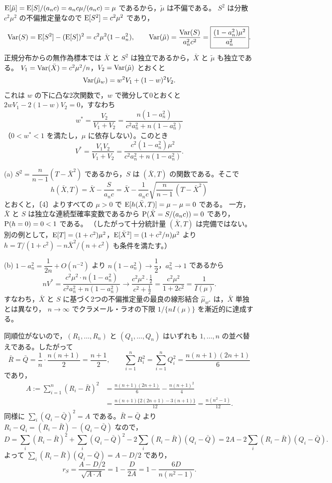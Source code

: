 \documentclass[a4paper,11pt]{ltjsarticle}
\begin{document}
$\operatorname{E}[\tilde\mu]=\operatorname{E}[S]/(a_nc)=a_nc\mu/(a_nc)=\mu$ であるから，$\tilde\mu$ は不偏である。
$S^2$ は分散 $c^2\mu^2$ の不偏推定量なので $\operatorname{E}[S^2]=c^2\mu^2$ であり，
\[
\operatorname{Var}(S)=\operatorname{E}[S^2]-(\operatorname{E}[S])^2=c^2\mu^2(1-a_n^2),
\qquad
\operatorname{Var}(\tilde\mu)=\frac{\operatorname{Var}(S)}{a_n^2c^2}=\boxed{\frac{(1-a_n^2)\mu^2}{a_n^2}}.
\]
正規分布からの無作為標本では $\bar X$ と $S^2$ は独立であるから，$\bar X$ と $\tilde\mu$ も独立である。
$V_1=\operatorname{Var}(\bar X)=c^2\mu^2/n$，$V_2=\operatorname{Var}(\tilde\mu)$ とおくと
\[
\operatorname{Var}(\hat\mu_w)=w^2V_1+(1-w)^2V_2 .
\]
これは $w$ の下に凸な2次関数で，$w$ で微分して0とおくと $2wV_1-2(1-w)V_2=0$，すなわち
\[
w^*=\frac{V_2}{V_1+V_2}=\boxed{\frac{n(1-a_n^2)}{c^2a_n^2+n(1-a_n^2)}}
\]
（$0<w^*<1$ を満たし，$\mu$ に依存しない）。このとき
\[
V^*=\frac{V_1V_2}{V_1+V_2}=\boxed{\frac{c^2(1-a_n^2)\mu^2}{c^2a_n^2+n(1-a_n^2)}}.
\]

(a) $S^2=\dfrac{n}{n-1}(T-\bar X^2)$ であるから，$S$ は $(\bar X,T)$ の関数である。そこで
\[
\boxed{h(\bar X,T)=\bar X-\frac{S}{a_nc}=\bar X-\frac{1}{a_nc}\sqrt{\frac{n}{n-1}\,(T-\bar X^2)}}
\]
とおくと，〔4〕よりすべての $\mu>0$ で $\operatorname{E}[h(\bar X,T)]=\mu-\mu=0$ である。
一方，$\bar X$ と $S$ は独立な連続型確率変数であるから $\operatorname{P}(\bar X=S/(a_nc))=0$ であり，$\operatorname{P}(h=0)=0<1$ である。
（したがって十分統計量 $(\bar X,T)$ は完備ではない。別の例として，$\operatorname{E}[T]=(1+c^2)\mu^2$，$\operatorname{E}[\bar X^2]=(1+c^2/n)\mu^2$ より
$h=T/(1+c^2)-n\bar X^2/(n+c^2)$ も条件を満たす。）

(b) $1-a_n^2=\dfrac{1}{2n}+O(n^{-2})$ より $n(1-a_n^2)\to\dfrac12$，$a_n^2\to1$ であるから
\[
nV^*=\frac{c^2\mu^2\cdot n(1-a_n^2)}{c^2a_n^2+n(1-a_n^2)}
\longrightarrow\frac{c^2\mu^2\cdot\frac12}{c^2+\frac12}=\boxed{\frac{c^2\mu^2}{1+2c^2}}=\frac{1}{I(\mu)}.
\]
すなわち，$\bar X$ と $S$ に基づく2つの不偏推定量の最良の線形結合 $\hat\mu_{w^*}$ は，$\bar X$ 単独とは異なり，
$n\to\infty$ でクラメール・ラオの下限 $1/\{nI(\mu)\}$ を漸近的に達成する。
\newpage

同順位がないので，$(R_1,\ldots,R_n)$ と $(Q_1,\ldots,Q_n)$ はいずれも $1,\ldots,n$ の並べ替えである。したがって
\[
\bar R=\bar Q=\frac1n\cdot\frac{n(n+1)}2=\frac{n+1}2,\qquad
\sum_{i=1}^nR_i^2=\sum_{i=1}^nQ_i^2=\frac{n(n+1)(2n+1)}6
\]
であり，
\begin{align*}
A:=\sum_{i=1}^n(R_i-\bar R)^2&=\frac{n(n+1)(2n+1)}6-\frac{n(n+1)^2}4\\
&=\frac{n(n+1)\{2(2n+1)-3(n+1)\}}{12}=\frac{n(n^2-1)}{12}.
\end{align*}
同様に $\sum_i(Q_i-\bar Q)^2=A$ である。$\bar R=\bar Q$ より $R_i-Q_i=(R_i-\bar R)-(Q_i-\bar Q)$ なので，
\[
D=\sum_i(R_i-\bar R)^2+\sum_i(Q_i-\bar Q)^2-2\sum_i(R_i-\bar R)(Q_i-\bar Q)=2A-2\sum_i(R_i-\bar R)(Q_i-\bar Q).
\]
よって $\sum_i(R_i-\bar R)(Q_i-\bar Q)=A-D/2$ であり，
\[
r_S=\frac{A-D/2}{\sqrt{A\cdot A}}=1-\frac{D}{2A}=1-\frac{6D}{n(n^2-1)}.
\]
\end{document}
